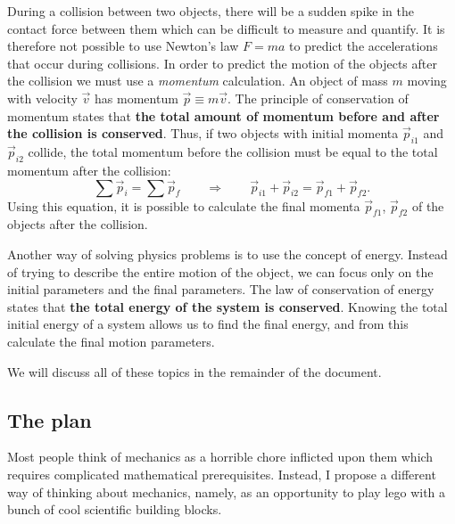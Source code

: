 \documentclass[letterpaper,9pt,journal]{IEEEtran}
\begin{document}



During a collision between two objects, 
there will be a sudden spike in the contact force between them
which can be difficult to measure and quantify.
It is therefore not possible to use Newton's law $F=ma$ to predict the accelerations that occur during collisions.
In order to predict the motion of the objects after the collision we must use a \emph{momentum} calculation.
An object of mass $m$ moving with velocity $\vec{v}$ has momentum $\vec{p}\equiv m\vec{v}$.
The principle of conservation of momentum states that {\bf the total amount of momentum before and
after the collision is conserved}. Thus, if two objects with initial momenta $\vec{p}_{i1}$ and $\vec{p}_{i2}$ collide,
the total momentum before the collision must be equal to the total momentum after the collision:
\[
	\sum \vec{p}_i = \sum \vec{p}_f 	
	\qquad
	\Rightarrow
	\qquad
	\vec{p}_{i1} + \vec{p}_{i2} 
		=
		\vec{p}_{f1} + \vec{p}_{f2}.
\]
Using this equation, it is possible to calculate the final momenta $\vec{p}_{f1}$, $\vec{p}_{f2}$
of the objects after the collision. 


Another way of solving physics problems is to use the concept of energy.
Instead of trying to describe the entire motion of the object, 
we can focus only on the initial parameters and the final parameters.
The law of conservation of energy states that {\bf the total energy of the system is conserved}.
Knowing the total initial energy of a system allows us to find the final energy,
and from this calculate the final motion parameters.

We will discuss all of these topics in the remainder of the document.

\vspace{-1mm}
\subsection{The plan}

Most people think of mechanics as a horrible chore inflicted upon them
which requires complicated mathematical prerequisites.
Instead, I propose a different way of thinking about mechanics,
namely, as an opportunity to play {\sc lego} with a bunch of cool
scientific building blocks.
%
\end{document}
